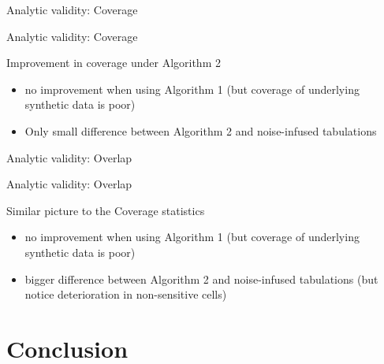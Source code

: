 \begin{frame}[fragile]{Analytic validity: Coverage}
	\begin{center}
\tiny
		
		
		
	\end{center}
\end{frame}

\begin{frame}[fragile]{Analytic validity: Coverage}
\begin{block}{Improvement in coverage under Algorithm 2}
\begin{itemize}
	\item no improvement when using Algorithm 1 (but coverage of underlying synthetic data is poor)
	\item Only small difference between Algorithm 2 and noise-infused tabulations
\end{itemize}
\end{block}
\end{frame}


\begin{frame}[fragile]{Analytic validity: Overlap}
	\begin{center}
\tiny
		
		
		
	\end{center}
\end{frame}



\begin{frame}[fragile]{Analytic validity: Overlap}
	\begin{block}{Similar picture to the Coverage statistics}
		\begin{itemize}
			\item no improvement when using Algorithm 1 (but coverage of underlying synthetic data is poor)
			\item bigger difference between Algorithm 2 and noise-infused tabulations (but notice deterioration in non-sensitive cells)
		\end{itemize}
	\end{block}
\end{frame}






\section{Conclusion}

